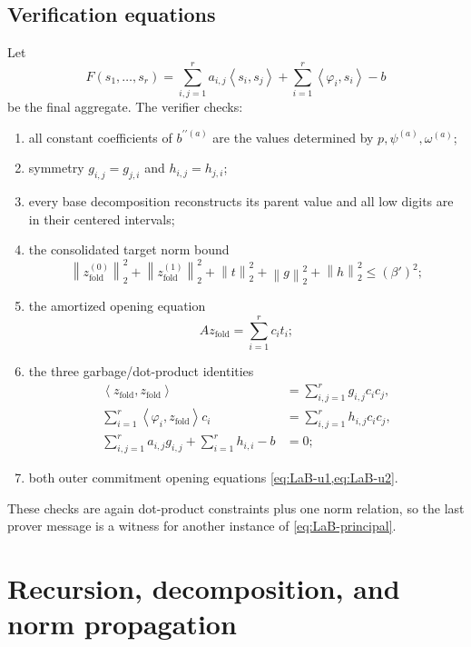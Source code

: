 \documentclass[11pt,a4paper]{article}
\newcommand{\norm}[1]{\left\lVert #1\right\rVert}
\newcommand{\inner}[2]{\left\langle #1,#2\right\rangle}
\begin{document}
\subsection{Verification equations}

Let
\[
 F(s_1,\ldots,s_r)
 =\sum_{i,j=1}^{r}a_{i,j}\inner{s_i}{s_j}
  +\sum_{i=1}^{r}\inner{\varphi_i}{s_i}-b
\]
be the final aggregate.  The verifier checks:
\begin{enumerate}
  \item all constant coefficients of \(b^{\prime\prime(a)}\) are the values
  determined by \(p,\psi^{(a)},\omega^{(a)}\);
  \item symmetry \(g_{i,j}=g_{j,i}\) and \(h_{i,j}=h_{j,i}\);
  \item every base decomposition reconstructs its parent value and all low
  digits are in their centered intervals;
  \item the consolidated target norm bound
  \begin{equation}
    \norm{z_{\mathrm{fold}}^{(0)}}_2^2
    +\norm{z_{\mathrm{fold}}^{(1)}}_2^2
    +\norm{t}_2^2+\norm{g}_2^2+\norm{h}_2^2
    \le(\beta')^2;
    \label{eq:LaB-consolidated-norm}
  \end{equation}
  \item the amortized opening equation
  \begin{equation}
    A z_{\mathrm{fold}}=\sum_{i=1}^{r}c_it_i;
    \label{eq:LaB-amortized-opening}
  \end{equation}
  \item the three garbage/dot-product identities
  \begin{align}
   \inner{z_{\mathrm{fold}}}{z_{\mathrm{fold}}}
     &=\sum_{i,j=1}^{r}g_{i,j}c_ic_j,
     \label{eq:LaB-g1}\\
   \sum_{i=1}^{r}\inner{\varphi_i}{z_{\mathrm{fold}}}c_i
     &=\sum_{i,j=1}^{r}h_{i,j}c_ic_j,
     \label{eq:LaB-g2}\\
   \sum_{i,j=1}^{r}a_{i,j}g_{i,j}+\sum_{i=1}^{r}h_{i,i}-b
     &=0;
     \label{eq:LaB-g3}
  \end{align}
  \item both outer commitment opening equations
  \cref{eq:LaB-u1,eq:LaB-u2}.
\end{enumerate}
These checks are again dot-product constraints plus one norm relation, so the
last prover message is a witness for another instance of
\cref{eq:LaB-principal}.

\section{Recursion, decomposition, and norm propagation}
\end{document}
